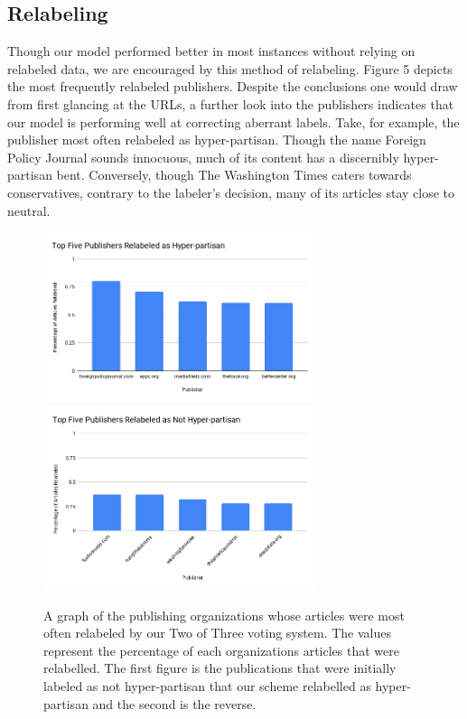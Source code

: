 \documentclass[11pt,a4paper]{article}
\begin{document}
\subsection{Relabeling}
Though our model performed better in most instances without relying on relabeled data, we are encouraged by this method of relabeling. Figure 5 depicts the most frequently relabeled publishers. Despite the conclusions one would draw from first glancing at the URLs, a further look into the publishers indicates that our model is performing well at correcting aberrant labels. Take, for example, the publisher most often relabeled as hyper-partisan. Though the name Foreign Policy Journal sounds innocuous, much of its content has a discernibly hyper-partisan bent. Conversely, though The Washington Times caters towards conservatives, contrary to the labeler's decision, many of its articles stay close to neutral. 

\begin{figure}[ht!]
\caption{A graph of the publishing organizations whose articles were most often relabeled by our Two of Three voting system. The values represent the percentage of each organizations articles that were relabelled. The first figure is the publications that were initially labeled as not hyper-partisan that our scheme relabelled as hyper-partisan and the second is the reverse.}
\includegraphics[width=8cm]{images/relabel_hyp.png}
\includegraphics[width=8cm]{images/relabel_not_hyp.png}
\end{figure}
\end{document}
